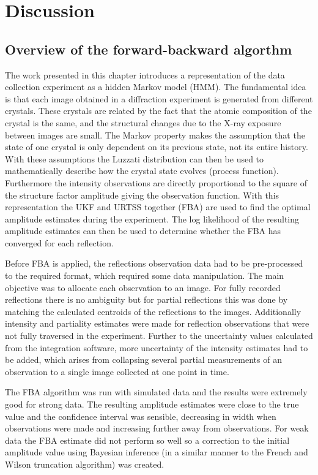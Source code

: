 \section{Discussion}
\label{sec:Discussion - Data Reduction}

\subsection{Overview of the forward-backward algorthm}
\label{sub:Overview of the forward-backward algorthm}
The work presented in this chapter introduces a representation of the data collection experiment as a hidden Markov model (HMM).
The fundamental idea is that each image obtained in a diffraction experiment is generated from different crystals.
These crystals are related by the fact that the atomic composition of the crystal is the same, and the structural changes due to the X-ray exposure between images are small.
The Markov property makes the assumption that the state of one crystal is only dependent on its previous state, not its entire history.
With these assumptions the Luzzati distribution \cite{luzzati1952traitement,read1990structure} can then be used to mathematically describe how the crystal state evolves (process function).
Furthermore the intensity observations are directly proportional to the square of the structure factor amplitude giving the observation function.
With this representation the UKF and URTSS together (FBA) are used to find the optimal amplitude estimates during the experiment.
The log likelihood of the resulting amplitude estimates can then be used to determine whether the FBA has converged for each reflection.

Before FBA is applied, the reflections observation data had to be pre-processed to the required format, which required some data manipulation.
The main objective was to allocate each observation to an image.
For fully recorded reflections there is no ambiguity but for partial reflections this was done by matching the calculated centroids of the reflections to the images.
Additionally intensity and partiality estimates were made for reflection observations that were not fully traversed in the experiment.
Further to the uncertainty values calculated from the integration software, more uncertainty of the intensity estimates had to be added, which arises from collapsing several partial measurements of an observation to a single image collected at one point in time.

The FBA algorithm was run with simulated data and the results were extremely good for strong data.
The resulting amplitude estimates were close to the true value and the confidence interval was sensible, decreasing in width when observations were made and increasing further away from observations.
For weak data the FBA estimate did not perform so well so a correction to the initial amplitude value using Bayesian inference (in a similar manner to the French and Wilson truncation algorithm) was created.


